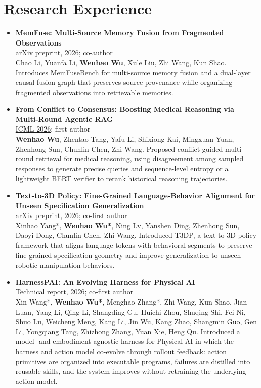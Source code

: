 \documentclass[a4paper,11pt]{article}
\newcommand{\paper}[3]{\item \textbf{#1}\\{\small #2}\\{\small #3}\vspace{3pt}}
\begin{document}
\section{Research Experience}
\begin{itemize}[leftmargin=1.4em,label=\textbullet,itemsep=6pt,topsep=2pt]\paper{MemFuse: Multi-Source Memory Fusion from Fragmented Observations}{\href{https://arxiv.org/abs/2608.18704}{arXiv preprint, 2026}; co-author}{Chao Li, Yuanfa Li, \textbf{Wenhao Wu}, Xule Liu, Zhi Wang, Kun Shao.}
Introduces MemFuseBench for multi-source memory fusion and a dual-layer causal fusion graph that preserves source provenance while organizing fragmented observations into retrievable memories.\par

\paper{From Conflict to Consensus: Boosting Medical Reasoning via Multi-Round Agentic RAG}{\href{https://openreview.net/forum?id=S7lpdz7NAW}{ICML 2026}; first author}{\textbf{Wenhao Wu}, Zhentao Tang, Yafu Li, Shixiong Kai, Mingxuan Yuan, Zhenhong Sun, Chunlin Chen, Zhi Wang.}
Proposed conflict-guided multi-round retrieval for medical reasoning, using disagreement among sampled responses to generate precise queries and sequence-level entropy or a lightweight BERT verifier to rerank historical reasoning trajectories.\par

\paper{Text-to-3D Policy: Fine-Grained Language-Behavior Alignment for Unseen Specification Generalization}{\href{https://arxiv.org/abs/2609.39599}{arXiv preprint, 2026}; co-first author}{Xinhao Yang*, \textbf{Wenhao Wu*}, Ning Lv, Yanshen Ding, Zhenhong Sun, Daoyi Dong, Chunlin Chen, Zhi Wang.}
Introduced T3DP, a text-to-3D policy framework that aligns language tokens with behavioral segments to preserve fine-grained specification geometry and improve generalization to unseen robotic manipulation behaviors.\par

\paper{HarnessPAI: An Evolving Harness for Physical AI}{\href{https://arxiv.org/abs/2609.29166}{Technical report, 2026}; co-first author}{Xin Wang*, \textbf{Wenhao Wu*}, Menghao Zhang*, Zhi Wang, Kun Shao, Jian Luan, Yang Li, Qing Li, Shangding Gu, Huichi Zhou, Shuqing Shi, Fei Ni, Shuo Lu, Weicheng Meng, Kang Li, Jin Wu, Kang Zhao, Shangmin Guo, Gen Li, Yongqiang Tang, Zhizhong Zhang, Yuan Xie, Heng Qu.}
Introduced a model- and embodiment-agnostic harness for Physical AI in which the harness and action model co-evolve through rollout feedback: action primitives are organized into executable programs, failures are distilled into reusable skills, and the system improves without retraining the underlying action model.\par


\end{itemize}
\end{document}
